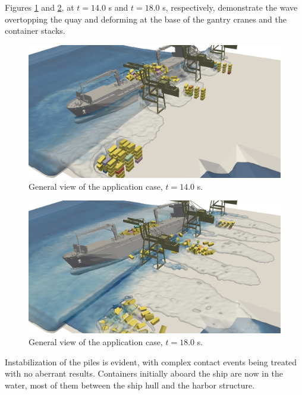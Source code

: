 Figures \ref{fig:sines_t70} and \ref{fig:sines_t90}, at $t=14.0$ s and $t=18.0$ s, respectively, demonstrate the wave overtopping the quay and deforming at the base of the gantry cranes and the container stacks. 
\begin{figure}[H]
	\centering
	\includegraphics[width=0.95\linewidth]{Figures/6.Chapter/sines_t70_II} 
	\caption{General view of the application case, $t=14.0$ s.}
	\label{fig:sines_t70} 
\end{figure}
%
%
\begin{figure}[H]
	\centering
	\includegraphics[width=0.95\linewidth]{Figures/6.Chapter/sines_t90_II} 
	\caption{General view of the application case, $t=18.0$ s.}
	\label{fig:sines_t90} 
\end{figure}
%
Instabilization of the piles is evident, with complex contact events being treated with no aberrant results. Containers initially aboard the ship are now in the water, most of them between the ship hull and the harbor structure.

